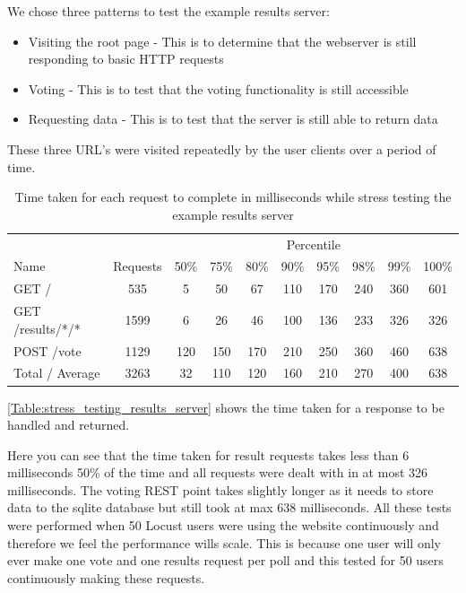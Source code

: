 We chose three patterns to test the example results server:

\begin{itemize}
\item Visiting the root page - This is to determine that the webserver is still responding to basic HTTP requests
\item Voting - This is to test that the voting functionality is still accessible
\item Requesting data - This is to test that the server is still able to return data
\end{itemize}

These three URL's were visited repeatedly by the user clients over a period of time.

\begin{table}
\caption{Time taken for each request to complete in milliseconds while stress testing the example results server}
\begin{tabular}{l c  c c c c c c c c }
\hline 
& & \multicolumn{8}{c}{Percentile} \\
Name & Requests & 50\% & 75\% & 80\% & 90\% & 95\% & 98\% & 99\% & 100\% \\ 
\hline 
GET / & 535 & 5 & 50 & 67 & 110 & 170 & 240 & 360 & 601 \\ 
\hline 
GET /results/*/* & 1599 & 6 & 26 & 46 & 100 & 136 & 233 & 326 & 326 \\ 
\hline 
POST /vote & 1129 & 120 & 150 & 170 & 210 & 250 & 360 & 460 & 638 \\ 
\hline 
Total / Average & 3263 & 32 & 110 & 120 & 160 & 210 & 270 & 400 & 638 \\ 
\hline 
\end{tabular}
\label{Table:stress_testing_results_server}
\end{table}

\autoref{Table:stress_testing_results_server} shows the time taken for a response to be handled and returned.

Here you can see that the time taken for result requests takes less than 6 milliseconds 50\% of the time and all requests were dealt with in at most 326 milliseconds. The voting REST point takes slightly longer as it needs to store data to the sqlite database but still took at max 638 milliseconds. All these tests were performed when 50 Locust users were using the website continuously and therefore we feel the performance wills scale. This is because one user will only ever make one vote and one results request per poll and this tested for 50 users continuously making these requests.

